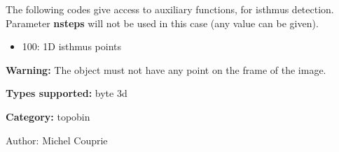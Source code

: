 The following codes give access to auxiliary functions, for isthmus detection. Parameter {\bf nsteps} will not be used in this case (any value can be given).

\begin{itemize}
\item 100: 1D isthmus points\end{itemize}
{\bf Warning:} The object must not have any point on the frame of the image.

{\bf Types supported:} byte 3d

{\bf Category:} topobin

\begin{Desc}
\item[Author:]Michel Couprie \end{Desc}
